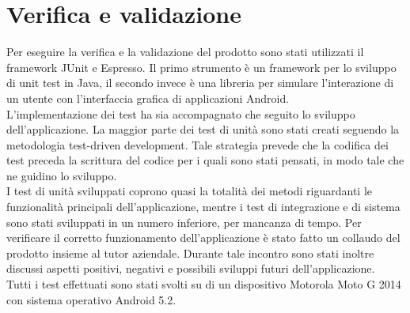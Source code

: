 \documentclass[../Tesi.tex]{subfiles}
\begin{document}
\section{Verifica e validazione}
	Per eseguire la verifica e la validazione del prodotto sono stati utilizzati il framework JUnit e Espresso. Il primo strumento è un framework per lo sviluppo di unit test in Java, il secondo invece è una libreria per 
	simulare l'interazione di un utente con l'interfaccia grafica di applicazioni Android. \\
	L'implementazione dei test ha sia accompagnato che seguito lo sviluppo dell'applicazione. La maggior parte dei test di unità sono stati creati seguendo la metodologia test-driven development. Tale strategia prevede che la codifica dei test preceda la scrittura del codice per i quali sono stati pensati, in modo tale che ne guidino lo sviluppo. \\
	I test di unità sviluppati coprono quasi la totalità dei metodi riguardanti le funzionalità principali dell'applicazione, mentre i test di integrazione e di sistema sono stati sviluppati in un numero inferiore, per mancanza di tempo. Per verificare il corretto funzionamento dell'applicazione è stato fatto un collaudo del prodotto insieme al tutor aziendale. Durante tale incontro sono stati inoltre discussi aspetti positivi, negativi e possibili sviluppi futuri dell'applicazione.\\
	Tutti i test effettuati sono stati svolti su di un dispositivo Motorola Moto G 2014 con sistema operativo Android 5.2.
\end{document}
